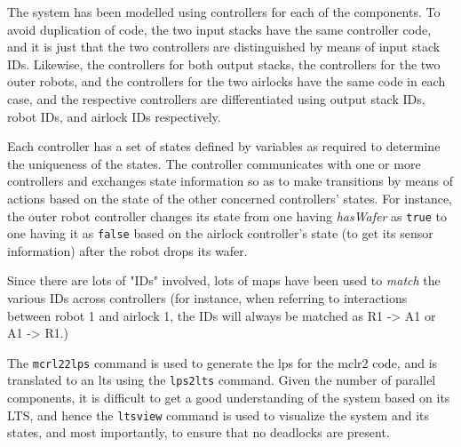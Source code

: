 The system has been modelled using controllers for each of the components. To avoid duplication of code, the two input stacks have the same controller code, and it is just that the two controllers are distinguished by means of input stack IDs. Likewise, the controllers for both output stacks, the controllers for the two outer robots, and the controllers for the two airlocks have the same code in each case, and the respective controllers are differentiated using output stack IDs, robot IDs, and airlock IDs respectively.

Each controller has a set of states defined by variables as required to determine the uniqueness of the states. The controller communicates with one or more controllers and exchanges state information so as to make transitions by means of actions based on the state of the other concerned controllers' states. For instance, the outer robot controller changes its state from one having \textit{hasWafer} as \texttt{true} to one having it as \texttt{false} based on the airlock controller's state (to get its sensor information) after the robot drops its wafer.

Since there are lots of "IDs" involved, lots of maps have been used to \textit{match} the various IDs across controllers (for instance, when referring to interactions between robot 1 and airlock 1, the IDs will always be matched as R1 -> A1 or A1 -> R1.)

The \texttt{mcrl22lps} command is used to generate the lps for the mclr2 code, and is translated to an lts using the \texttt{lps2lts} command. Given the number of parallel components, it is difficult to get a good understanding of the system based on its LTS, and hence the \texttt{ltsview} command is used to visualize the system and its states, and most importantly, to ensure that no deadlocks are present. 